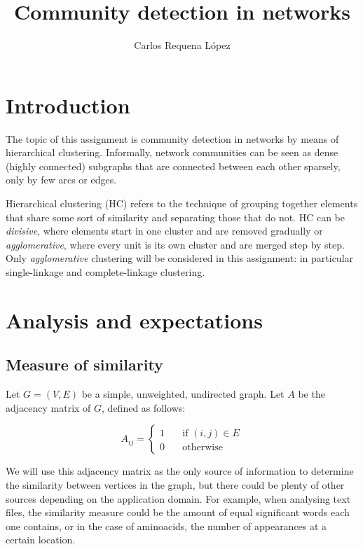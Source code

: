 \documentclass[12pt,a4paper]{article}
\title{Community detection in networks}
\author{Carlos Requena López}
\begin{document}
\thispagestyle{fancy}
\maketitle
\thispagestyle{fancy}

\section{Introduction}

The topic of this assignment is community detection in networks by
means of hierarchical clustering. Informally, network communities can
be seen as dense (highly connected) subgraphs that are connected
between each other sparsely, only by few arcs or edges.

Hierarchical clustering (HC) refers to the technique of grouping
together elements that share some sort of similarity and separating
those that do not. HC can be \emph{divisive}, where elements start in
one cluster and are removed gradually or \emph{agglomerative}, where
every unit is its own cluster and are merged step by step. Only
\emph{agglomerative} clustering will be considered in this assignment:
in particular single-linkage and complete-linkage clustering.

\section{Analysis and expectations}

\subsection{Measure of similarity}

Let $ G = (V, E) $ be a simple, unweighted, undirected graph. Let $A$
be the adjacency matrix of $G$, defined as follows:

\[
  A_{ij} =
  \begin{cases}
    1 & \quad \text{if } (i,j) \in E\\
    0 & \quad \text{otherwise }
  \end{cases}
\]

We will use this adjacency matrix as the only source of information to
determine the similarity between vertices in the graph, but there
could be plenty of other sources depending on the application
domain. For example, when analysing text files, the similarity measure
could be the amount of equal significant words each one contains, or
in the case of aminoacids, the number of appearances at a certain
location.
\end{document}

